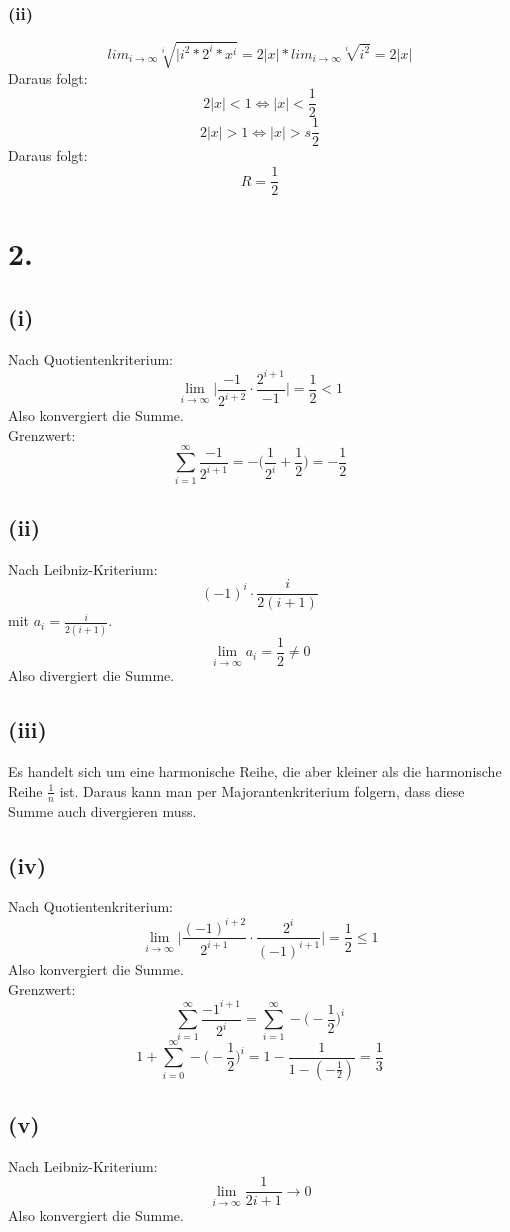 \documentclass[a4paper]{scrartcl}
\begin{document}
\subsubsection{(ii)}
\[lim_{i\to\infty} \sqrt[i]{|i^2 * 2^i * x^i} = 2|x| * lim_{i\to\infty} \sqrt[i]{i^2} = 2|x|\]
Daraus folgt: 
\[2|x| < 1 \Leftrightarrow |x| < \frac{1}{2}\]
\[2|x| > 1 \Leftrightarrow |x| >s \frac{1}{2}\]
Daraus folgt: \\
\[R = \frac{1}{2}\]
\section{2.}
\subsection{(i)}
Nach Quotientenkriterium:
\[ \lim_{i\to\infty} \bigg|\frac {-1} {2^{i+2}} \cdot \frac {2^{i+1}} {-1}\bigg| = \frac 1 2 < 1 \]
Also konvergiert die Summe. \\
Grenzwert: 
\[ \sum_{i=1}^\infty \frac {-1} {2^{i+1}} = - \Big(\frac 1 {2^i} + \frac 1 2 \Big) = - \frac 1 2 \]

\subsection{(ii)}
Nach Leibniz-Kriterium:
\[ (-1)^i \cdot \frac i {2(i+1)} \]
mit \(a_i = \frac i {2(i+1)} \).
\[ \lim_{i\to\infty} a_i = \frac 1 2 \neq 0 \]
Also divergiert die Summe.

\subsection{(iii)}
Es handelt sich um eine harmonische Reihe, die aber kleiner als die harmonische Reihe \( \frac 1 n \) ist. Daraus kann man per Majorantenkriterium folgern, dass diese Summe auch divergieren muss.

\subsection{(iv)}
Nach Quotientenkriterium:
\[ \lim_{i\to\infty} \bigg| \frac {(-1)^{i+2}} {2^{i+1}} \cdot \frac {2^i} {(-1)^{i+1}} \bigg| = \frac 1 2 \le 1 \]
Also konvergiert die Summe. \\
Grenzwert:
\[ \sum_{i=1}^\infty \frac {{-1}^{i+1}} {2^i} = \sum_{i=1}^\infty -\Big(-\frac 1 2\Big)^i \]
\[ 1+\sum_{i=0}^\infty -\Big(-\frac 1 2\Big)^i = 1 -\frac 1 {1-(-\frac 1 2)} = \frac 1 3 \]

\subsection{(v)}
Nach Leibniz-Kriterium:
\[ \lim_{i\to\infty} \frac 1 {2i+1} \rightarrow 0 \]
Also konvergiert die Summe.
\end{document}
